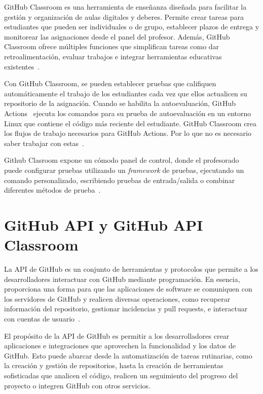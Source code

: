 GitHub Classroom es una herramienta de enseñanza diseñada para facilitar la gestión y organización de aulas digitales y deberes. Permite crear tareas para estudiantes que pueden ser  individuales o de grupo, establecer plazos de entrega y monitorear las asignaciones desde el panel del profesor. Además, GitHub Classroom ofrece múltiples funciones que simplifican tareas como dar retroalimentación, evaluar trabajos e integrar herramientas educativas existentes~\cite{githubAboutClassroom}.

Con GitHub Classroom, se pueden establecer pruebas que califiquen automáticamente el trabajo de los estudiantes cada vez que ellos actualicen su repositorio de la asignación. Cuando se habilita la autoevaluación, GitHub Actions~\cite{githubUnderstandingActions} ejecuta los comandos para su prueba de autoevaluación en un entorno Linux que contiene el código más reciente del estudiante. GitHub Classroom crea los flujos de trabajo necesarios para GitHub Actions. Por lo que no es necesario saber trabajar con estas~\cite{githubAutogradingClasroom}.

Github Clasroom expone un cómodo panel de control, donde el profesorado puede configurar pruebas utilizando un \textit{framework} de pruebas, ejecutando un comando personalizado, escribiendo pruebas de entrada/salida o combinar diferentes métodos de prueba~\cite{githubAutogradingClasroom}.

\section{GitHub API y GitHub API Classroom}
La \acrshort{API} de GitHub es un conjunto de herramientas y protocolos que permite a los desarrolladores interactuar con GitHub mediante programación. En esencia, proporciona una forma para que las aplicaciones de software se comuniquen con los servidores de GitHub y realicen diversas operaciones, como recuperar información del repositorio, gestionar incidencias y pull requests, e interactuar con cuentas de usuario~\cite{githubAPI}.

El propósito de la \acrshort{API} de GitHub es permitir a los desarrolladores crear aplicaciones e integraciones que aprovechen la funcionalidad y los datos de GitHub. Esto puede abarcar desde la automatización de tareas rutinarias, como la creación y gestión de repositorios, hasta la creación de herramientas sofisticadas que analicen el código, realicen un seguimiento del progreso del proyecto o integren GitHub con otros servicios.

